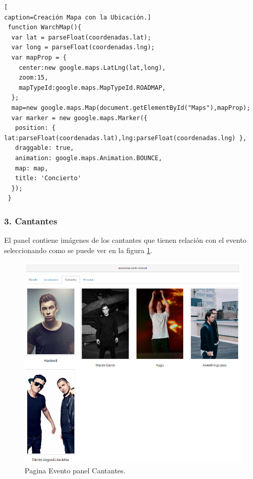 \begin{lstlisting}[
caption=Creación Mapa con la Ubicación.]
 function WarchMap(){
  var lat = parseFloat(coordenadas.lat);
  var long = parseFloat(coordenadas.lng);
  var mapProp = {
    center:new google.maps.LatLng(lat,long),
    zoom:15,
    mapTypeId:google.maps.MapTypeId.ROADMAP,
  };
  map=new google.maps.Map(document.getElementById("Maps"),mapProp);
  var marker = new google.maps.Marker({
   position: { lat:parseFloat(coordenadas.lat),lng:parseFloat(coordenadas.lng) },
   draggable: true,
   animation: google.maps.Animation.BOUNCE,
   map: map,
   title: 'Concierto'
  });
 }
\end{lstlisting}
\subsubsection*{3. Cantantes}
El panel contiene imágenes de los cantantes que tienen relación con el evento seleccionando como se puede ver en la figura \ref{fig:Cantantes_Evento}.
\begin{figure}[!h]
\begin{center}
   \includegraphics[width=0.5\linewidth]{Figures/Cantantes_Evento}
  \decoRule
  \caption[Evento panel Cantantes]{Pagina Evento panel Cantantes.}
\label{fig:Cantantes_Evento}
\end{center}
\end{figure}
